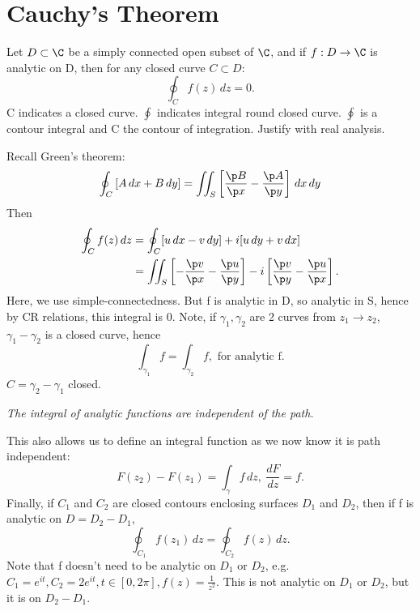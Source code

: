 \documentclass[a4paper, 11pt, normalem]{report}
\begin{document}
\section{Cauchy's Theorem}
Let $D \subset \C$ be a simply connected open subset of $\C$, and if $f: D \to \C$ is analytic on D, then for any closed curve $C \subset D$:
\begin{equation}
    \oint_C f(z)\,dz = 0.
\end{equation}
C indicates a closed curve. $\oint$ indicates integral round closed curve.
$\oint$ is a contour integral and C the contour of integration.
Justify with real analysis.

Recall Green's theorem:
\begin{equation}
    \oint_C \left[A\,dx + B\,dy\right] = \iint_S \left[\frac{\p B}{\p x} - \frac{\p A}{\p y}\right]\,dx\,dy
\end{equation}
Then
\begin{align}
    \oint_C f(z)\,dz &= \oint_C [u\,dx - v\,dy] + i[u\,dy + v\,dx] \\
                     &= \iint_S \left[-\frac{\p v}{\p x} - \frac{\p u}{\p y}\right] - i\left[\frac{\p v}{\p y} - \frac{\p u}{\p x}\right].
\end{align}
Here, we use simple-connectedness.
But f is analytic in D, so analytic in S, hence by CR relations, this integral is 0.
Note, if $\gamma_1,\gamma_2$ are 2 curves from $z_1 \to z_2$, $\gamma_1 - \gamma_2$ is a closed curve, hence
\begin{equation}
    \int_{\gamma_1} f = \int_{\gamma_2} f, \text{ for analytic f.}
\end{equation}
$C = \gamma_2 - \gamma_1$ closed.

\emph{The integral of analytic functions are independent of the path.}

This also allows us to define an integral function as we now know it is path independent:
\begin{equation}
    F(z_2) - F(z_1) = \int_\gamma f\,dz,~ \frac{dF}{dz} = f.
\end{equation}
Finally, if $C_1$ and $C_2$ are closed contours enclosing surfaces $D_1$ and $D_2$, then if f is analytic on $D = D_2 - D_1$,
\begin{equation}
    \oint_{C_1} f(z_1)\,dz = \oint_{C_2}f(z)\,dz.
\end{equation}
Note that f doesn't need to be analytic on $D_1$ or $D_2$, e.g. $C_1 = e^{it}, C_2 = 2e^{it}, t \in [0,2\pi], f(z) = \frac{1}{z^2}$. This is not analytic on $D_1$ or $D_2$, but it is on $D_2 - D_1$.
\end{document}
